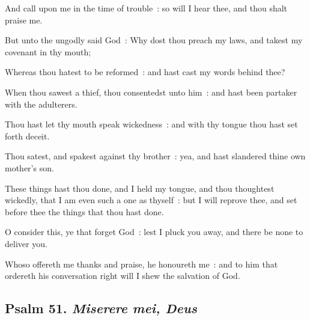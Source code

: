 And call upon me in the time of trouble~: so will I hear thee, and thou shalt praise me.\par
{}But unto the ungodly said God~: Why dost thou preach my laws, and takest my covenant in thy mouth;\par
{}Whereas thou hatest to be reformed~: and hast cast my words behind thee?\par
{}When thou sawest a thief, thou consentedst unto him~: and hast been partaker with the adulterers.\par
{}Thou hast let thy mouth speak wickedness~: and with thy tongue thou hast set forth deceit.\par
{}Thou satest, and spakest against thy brother~: yea, and hast slandered thine own mother's son.\par
{}These things hast thou done, and I held my tongue, and thou thoughtest wickedly, that I am even such a one as thyself~: but I will reprove thee, and set before thee the things that thou hast done.\par
{}O consider this, ye that forget God~: lest I pluck you away, and there be none to deliver you.\par
{}Whoso offereth me thanks and praise, he honoureth me~: and to him that ordereth his conversation right will I shew the salvation of God.\par


\clearpage
\subsection{Psalm 51. \textit{Miserere mei, Deus}}








